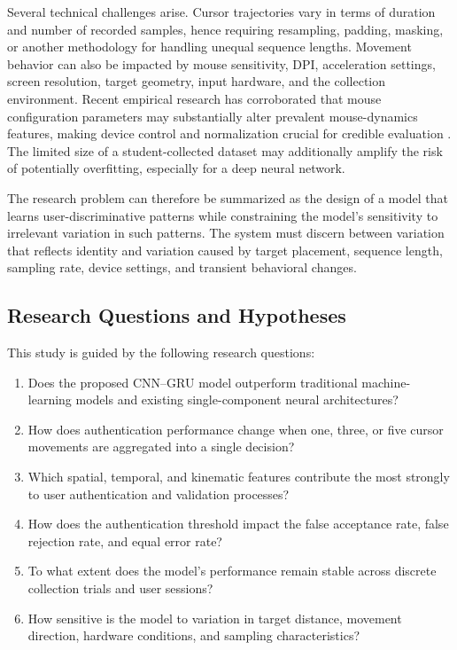 \documentclass[conference]{IEEEtran}
\begin{document}
Several technical challenges arise. Cursor trajectories vary in terms of duration and number of recorded samples, hence requiring resampling, padding, masking, or another methodology for handling unequal sequence lengths. Movement behavior can also be impacted by mouse sensitivity, DPI, acceleration settings, screen resolution, target geometry, input hardware, and the collection environment. Recent empirical research has corroborated that mouse configuration parameters may substantially alter prevalent mouse-dynamics features, making device control and normalization crucial for credible evaluation \cite{kuricMouseCredibility}. The limited size of a student-collected dataset may additionally amplify the risk of potentially overfitting, especially for a deep neural network. 

The research problem can therefore be summarized as the design of a model that learns user-discriminative patterns while constraining the model's sensitivity to irrelevant variation in such patterns. The system must discern between variation that reflects identity and variation caused by target placement, sequence length, sampling rate, device settings, and transient behavioral changes.

\subsection{Research Questions and Hypotheses}
This study is guided by the following research questions:

\begin{enumerate}
    \item Does the proposed CNN--GRU model outperform traditional machine-learning models and existing single-component neural architectures?

    \item How does authentication performance change when one, three, or five cursor movements are aggregated into a single decision?

    \item Which spatial, temporal, and kinematic features contribute the most strongly to user authentication and validation processes?

    \item How does the authentication threshold impact the false acceptance rate, false rejection rate, and equal error rate?

    \item To what extent does the model's performance remain stable across discrete collection trials and user sessions?

    \item How sensitive is the model to variation in target distance, movement direction, hardware conditions, and sampling characteristics?
\end{enumerate}
\end{document}
